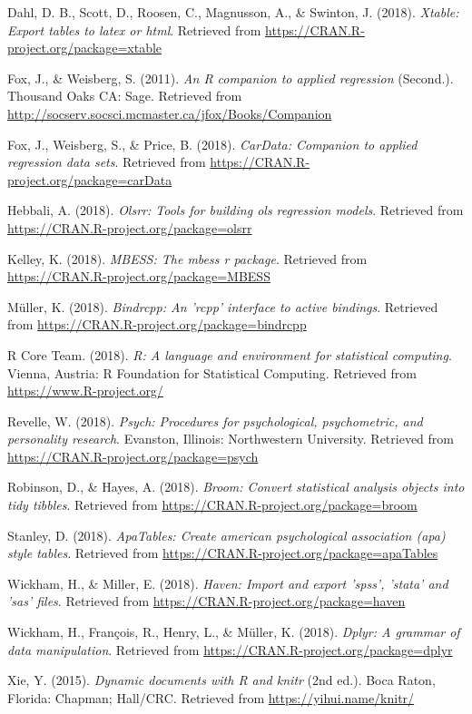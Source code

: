 \documentclass[man,floatsintext]{apa6}
\begin{document}
\hypertarget{ref-R-xtable}{}
Dahl, D. B., Scott, D., Roosen, C., Magnusson, A., \& Swinton, J.
(2018). \emph{Xtable: Export tables to latex or html}. Retrieved from
\url{https://CRAN.R-project.org/package=xtable}

\hypertarget{ref-R-car}{}
Fox, J., \& Weisberg, S. (2011). \emph{An R companion to applied
regression} (Second.). Thousand Oaks CA: Sage. Retrieved from
\url{http://socserv.socsci.mcmaster.ca/jfox/Books/Companion}

\hypertarget{ref-R-carData}{}
Fox, J., Weisberg, S., \& Price, B. (2018). \emph{CarData: Companion to
applied regression data sets}. Retrieved from
\url{https://CRAN.R-project.org/package=carData}

\hypertarget{ref-R-olsrr}{}
Hebbali, A. (2018). \emph{Olsrr: Tools for building ols regression
models}. Retrieved from \url{https://CRAN.R-project.org/package=olsrr}

\hypertarget{ref-R-MBESS}{}
Kelley, K. (2018). \emph{MBESS: The mbess r package}. Retrieved from
\url{https://CRAN.R-project.org/package=MBESS}

\hypertarget{ref-R-bindrcpp}{}
Müller, K. (2018). \emph{Bindrcpp: An 'rcpp' interface to active
bindings}. Retrieved from
\url{https://CRAN.R-project.org/package=bindrcpp}

\hypertarget{ref-R-base}{}
R Core Team. (2018). \emph{R: A language and environment for statistical
computing}. Vienna, Austria: R Foundation for Statistical Computing.
Retrieved from \url{https://www.R-project.org/}

\hypertarget{ref-R-psych}{}
Revelle, W. (2018). \emph{Psych: Procedures for psychological,
psychometric, and personality research}. Evanston, Illinois:
Northwestern University. Retrieved from
\url{https://CRAN.R-project.org/package=psych}

\hypertarget{ref-R-broom}{}
Robinson, D., \& Hayes, A. (2018). \emph{Broom: Convert statistical
analysis objects into tidy tibbles}. Retrieved from
\url{https://CRAN.R-project.org/package=broom}

\hypertarget{ref-R-apaTables}{}
Stanley, D. (2018). \emph{ApaTables: Create american psychological
association (apa) style tables}. Retrieved from
\url{https://CRAN.R-project.org/package=apaTables}

\hypertarget{ref-R-haven}{}
Wickham, H., \& Miller, E. (2018). \emph{Haven: Import and export
'spss', 'stata' and 'sas' files}. Retrieved from
\url{https://CRAN.R-project.org/package=haven}

\hypertarget{ref-R-dplyr}{}
Wickham, H., François, R., Henry, L., \& Müller, K. (2018). \emph{Dplyr:
A grammar of data manipulation}. Retrieved from
\url{https://CRAN.R-project.org/package=dplyr}

\hypertarget{ref-R-knitr}{}
Xie, Y. (2015). \emph{Dynamic documents with R and knitr} (2nd ed.).
Boca Raton, Florida: Chapman; Hall/CRC. Retrieved from
\url{https://yihui.name/knitr/}

\endgroup
\end{document}
